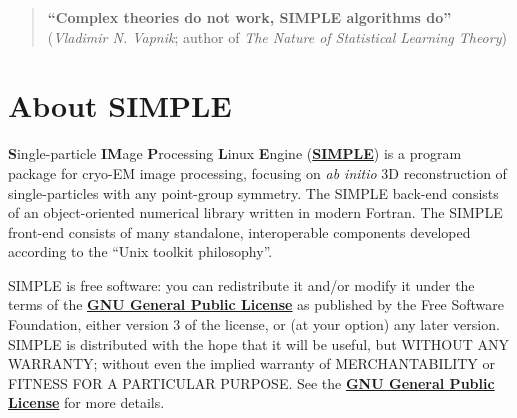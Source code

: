 \documentclass[a4paper,11pt]{article}
\begin{document}
\begin{quote}
\textbf{``Complex theories do not work, SIMPLE algorithms do''}\\(\textit{Vladimir N. Vapnik}; author of \textit{The Nature of Statistical Learning Theory})
\end{quote}
\clearpage

\tableofcontents{}
\clearpage

\section{About SIMPLE}

\textbf{S}ingle-particle \textbf{IM}age \textbf{P}rocessing \textbf{L}inux \textbf{E}ngine (\href{www.simplecryoem.com}{\textbf{\textcolor{BurntOrange}{SIMPLE}}}) is a program package for cryo-EM image processing, focusing on \textit{ab initio} 3D reconstruction of single-particles with any point-group symmetry. The SIMPLE back-end consists of an object-oriented numerical library written in modern Fortran. The SIMPLE front-end consists of many standalone, interoperable components developed according to the ``Unix toolkit philosophy''.

SIMPLE is free software: you can redistribute it and/or modify it under the terms of the \href{http://www.gnu.org/copyleft/gpl.html}{\textbf{\textcolor{BurntOrange}{GNU General Public License}}} as published by the Free Software Foundation, either version 3 of the license, or (at your option) any later version. SIMPLE is distributed with the hope that it will be useful, but WITHOUT ANY WARRANTY; without even the implied warranty of MERCHANTABILITY or FITNESS FOR A PARTICULAR PURPOSE. See the \href{http://www.gnu.org/copyleft/gpl.html}{\textbf{\textcolor{BurntOrange}{GNU General Public License}}} for more details.
\end{document}

